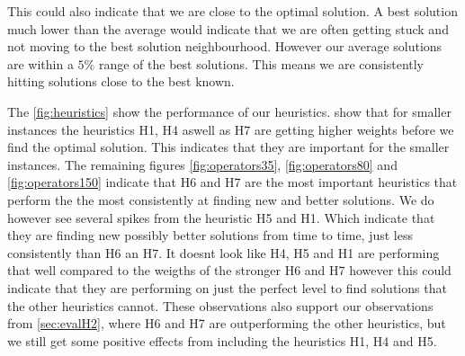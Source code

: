 \documentclass[../main.tex]{subfiles}
\begin{document}
This could also indicate that we are close to the optimal solution. 
A best solution much lower than the average would indicate that we are often getting stuck and not moving to the best solution neighbourhood. 
However our average solutions are within a $5\%$ range of the best solutions.
This means we are consistently hitting solutions close to the best known.
\par
The \cref{fig:heuristics} show the performance of our heuristics.
 show that for smaller instances the heuristics H1, H4 aswell as H7 are getting higher weights before we find the optimal solution. This indicates that they are important for the smaller instances.
The remaining figures \ref{fig:operators35}, \ref{fig:operators80} and \ref{fig:operators150} indicate that H6 and H7 are the most important heuristics that perform the the most consistently at finding new and better solutions. 
We do however see several spikes from the heuristic H5 and H1. 
Which indicate that they are finding new possibly better solutions from time to time, just less consistently than H6 an H7. 
It doesnt look like H4, H5 and H1 are performing that well compared to the weigths of the stronger H6 and H7 however this could indicate that they are performing on just the perfect level to find solutions that the other heuristics  cannot. 
These observations also support our observations from \cref{sec:evalH2}, where H6 and H7 are outperforming the other heuristics, but we still get some positive effects from including the heuristics H1, H4 and H5. 

\biblio                                                         
\end{document}
